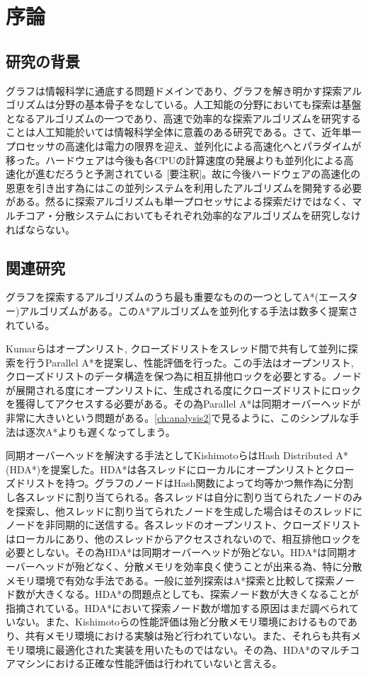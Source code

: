 \documentclass{jsarticle}
\begin{document}
\tableofcontents

\section{序論}

\subsection{研究の背景}
グラフは情報科学に通底する問題ドメインであり、グラフを解き明かす探索アルゴリズムは分野の基本骨子をなしている。人工知能の分野においても探索は基盤となるアルゴリズムの一つであり、高速で効率的な探索アルゴリズムを研究することは人工知能於いては情報科学全体に意義のある研究である。さて、近年単一プロセッサの高速化は電力の限界を迎え、並列化による高速化へとパラダイムが移った。ハードウェアは今後も各CPUの計算速度の発展よりも並列化による高速化が進むだろうと予測されている [要注釈]。故に今後ハードウェアの高速化の恩恵を引き出す為にはこの並列システムを利用したアルゴリズムを開発する必要がある。然るに探索アルゴリズムも単一プロセッサによる探索だけではなく、マルチコア・分散システムにおいてもそれぞれ効率的なアルゴリズムを研究しなければならない。


\subsection{関連研究}

グラフを探索するアルゴリズムのうち最も重要なものの一つとしてA*(エースター)アルゴリズムがある\cite{Hart1968}。このA*アルゴリズムを並列化する手法は数多く提案されている。

Kumarらはオープンリスト, クローズドリストをスレッド間で共有して並列に探索を行うParallel A*を提案し、性能評価を行った\cite{kumar1988parallel}。この手法はオープンリスト, クローズドリストのデータ構造を保つ為に相互排他ロックを必要とする。ノードが展開される度にオープンリストに、生成される度にクローズドリストにロックを獲得してアクセスする必要がある。その為Parallel A*は同期オーバーヘッドが非常に大きいという問題がある。\ref{ch:analysis2}で見るように、このシンプルな手法は逐次A*よりも遅くなってしまう。

同期オーバーヘッドを解決する手法としてKishimotoらはHash Distributed A*(HDA*)を提案した\cite{Kishimoto2013}。HDA*は各スレッドにローカルにオープンリストとクローズドリストを持つ。グラフのノードはHash関数によって均等かつ無作為に分割し各スレッドに割り当てられる。各スレッドは自分に割り当てられたノードのみを探索し、他スレッドに割り当てられたノードを生成した場合はそのスレッドにノードを非同期的に送信する。各スレッドのオープンリスト、クローズドリストはローカルにあり、他のスレッドからアクセスされないので、相互排他ロックを必要としない。その為HDA*は同期オーバーヘッドが殆どない。HDA*は同期オーバーヘッドが殆どなく、分散メモリを効率良く使うことが出来る為、特に分散メモリ環境で有効な手法である。一般に並列探索はA*探索と比較して探索ノード数が大きくなる。HDA*の問題点としても、探索ノード数が大きくなることが指摘されている。HDA*において探索ノード数が増加する原因はまだ調べられていない。また、Kishimotoらの性能評価は殆ど分散メモリ環境におけるものであり、共有メモリ環境における実験は殆ど行われていない。また、それらも共有メモリ環境に最適化された実装を用いたものではない。その為、HDA*のマルチコアマシンにおける正確な性能評価は行われていないと言える。
\end{document}
